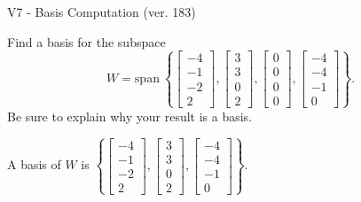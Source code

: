 \begin{exercise}
  \begin{exerciseTitle}V7 - Basis Computation (ver. 183)\end{exerciseTitle}
  \begin{exerciseStatement}
    Find a basis for the subspace 
\[W=\mathrm{span}\ \left\{\left[\begin{array}{r}
-4 \\
-1 \\
-2 \\
2
\end{array}\right] , \left[\begin{array}{r}
3 \\
3 \\
0 \\
2
\end{array}\right] , \left[\begin{array}{r}
0 \\
0 \\
0 \\
0
\end{array}\right] , \left[\begin{array}{r}
-4 \\
-4 \\
-1 \\
0
\end{array}\right]\right\}.\]
 Be sure to explain why your result is a basis.


  \end{exerciseStatement}
  \begin{exerciseAnswer}
   A basis of \(W\) is  \(\left\{\left[\begin{array}{r}
-4 \\
-1 \\
-2 \\
2
\end{array}\right] , \left[\begin{array}{r}
3 \\
3 \\
0 \\
2
\end{array}\right] , \left[\begin{array}{r}
-4 \\
-4 \\
-1 \\
0
\end{array}\right]\right\}\).
  


  \end{exerciseAnswer}
\end{exercise}